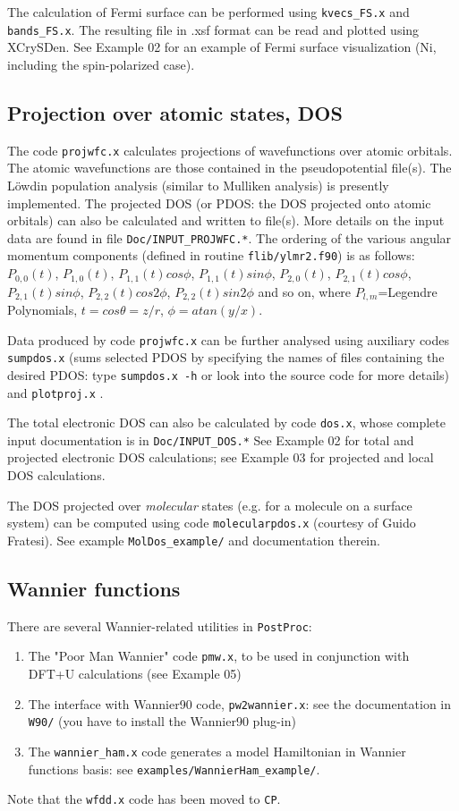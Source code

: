 \documentclass[12pt,a4paper]{article}
\def\CP{\texttt{CP}}
\def\PostProc{\texttt{PostProc}}
\begin{document}
The calculation of Fermi surface can be performed using 
\texttt{kvecs\_FS.x} and
\texttt{bands\_FS.x}. The resulting file in .xsf format can be read and plotted
using XCrySDen. See Example 02 for an example of Fermi surface 
visualization (Ni, including the spin-polarized case).

\subsection{Projection over atomic states, DOS}

The code \texttt{projwfc.x} calculates projections of wavefunctions
over atomic orbitals. The atomic wavefunctions are those contained
in the pseudopotential file(s). The L\"owdin population analysis (similar to
Mulliken analysis) is presently implemented. The projected DOS (or PDOS:
the DOS projected onto atomic orbitals) can also be calculated and written
to file(s). More details on the input data are found in file
\texttt{Doc/INPUT\_PROJWFC.*}. The ordering of the various 
angular momentum components (defined in routine \texttt{flib/ylmr2.f90})
is as follows:
$P_{0,0}(t)$, $P_{1,0}(t)$, $P_{1,1}(t)cos\phi$, $P_{1,1}(t)sin\phi$,
 $P_{2,0}(t)$, $P_{2,1}(t)cos\phi$, $P_{2,1}(t)sin\phi$, 
 $P_{2,2}(t)cos2\phi$, $P_{2,2}(t)sin2\phi$
and so on, where $P_{l,m}$=Legendre Polynomials, 
$t = cos\theta = z/r$, $\phi= atan(y /x)$.

Data produced by code \texttt{projwfc.x} can be further 
analysed using auxiliary codes \texttt{sumpdos.x} (sums selected PDOS
by specifying the names of files containing the desired PDOS: type 
\texttt{sumpdos.x -h} or look into the source code for more details) 
and \texttt{plotproj.x} . 

The total electronic DOS can also be calculated by code \texttt{dos.x},
whose complete input documentation is in \texttt{Doc/INPUT\_DOS.*}
See Example 02 for total and projected electronic DOS calculations;
see Example 03 for projected and local DOS calculations.

The DOS projected over {\em molecular} states (e.g. for a molecule on
a surface system) can be computed using code \texttt{molecularpdos.x}
(courtesy of Guido Fratesi). See example \texttt{MolDos\_example/}
and documentation therein.

\subsection{Wannier functions}

There are several Wannier-related utilities in \PostProc:
\begin{enumerate}
\item The "Poor Man Wannier" code \texttt{pmw.x}, to be used
in conjunction with DFT+U calculations (see Example 05)
\item The interface with Wannier90 code, \texttt{pw2wannier.x}:
see the documentation in \texttt{W90/} (you have to install the 
Wannier90 plug-in)
\item The \texttt{wannier\_ham.x} code generates a model Hamiltonian 
in Wannier functions basis: see \texttt{examples/WannierHam\_example/}.
\end{enumerate}
Note that the \texttt{wfdd.x} code has been moved to \CP.
\end{document}
